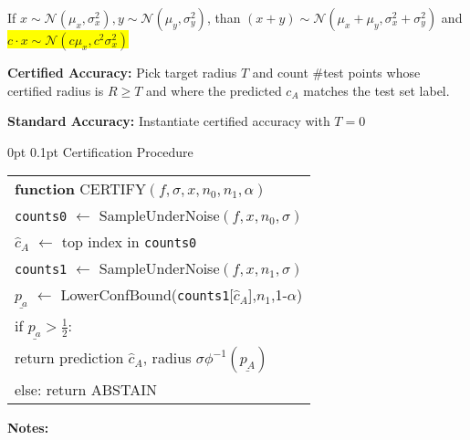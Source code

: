\documentclass[11pt,landscape,a4paper,fleqn]{article}
\makeatletter
\renewcommand{\subsection}{\@startsection{subsection}{1}{0mm}%
                                {0pt}%
                                {0.1pt}%
                            	{\color{myorange2}\sffamily\small}}
\newcommand{\mhl}[1]{\setlength{\fboxsep}{0pt}\colorbox{yellow}{#1}}
\makeatother
\begin{document}
\begin{multicols*}{4}
If $x \sim \mathcal{N}(\mu_x, \sigma_x^2), y \sim \mathcal{N}(\mu_y, \sigma_y^2)$, than $(x+y) \sim \mathcal{N}(\mu_x + \mu_y, \sigma_x^2 + \sigma_y^2)$ and \mhl{$c\cdot x \sim \mathcal{N}(c\mu_x, c^2\sigma_x^2)$}

\vspace*{1mm}
\textbf{Certified Accuracy:} Pick target radius $T$ and count \#test points whose certified radius is $R \geq T$ and where the predicted $c_A$ matches the test set label.

\textbf{Standard Accuracy:} Instantiate certified accuracy with $T = 0$

\vspace*{1mm}
\subsection{Certification Procedure}

\begin{tabular}{l}
\hline 
\textbf{function} CERTIFY$(f,\sigma,x,n_0,n_1,\alpha)$ \hfill \\
\-\hspace{3mm} \texttt{counts0} $\leftarrow$ SampleUnderNoise$(f,x,n_0,\sigma)$ \hfill \\
\-\hspace{3mm} $\hat{c}_A$ $\leftarrow$ top index in \texttt{counts0} \hfill \\
\-\hspace{3mm} \texttt{counts1} $\leftarrow$ SampleUnderNoise$(f,x,n_1,\sigma)$ \hfill \\
\-\hspace{3mm} $\underline{p_a}$ $\leftarrow$ LowerConfBound(\texttt{counts1}[$\hat{c}_A$],$n_1$,1-$\alpha$) \hfill \\
\-\hspace{3mm} if $\underline{p_a} > \frac{1}{2}$: \hfill \\
\-\hspace*{6mm} return prediction $\hat{c}_A$, radius $\sigma \phi^{-1}(\underline{p_A})$ \hfill \\
\-\hspace{3mm} else: return ABSTAIN \hfill \\
\hline 
\end{tabular} 



\textbf{Notes:}


\end{multicols*}
\end{document}
